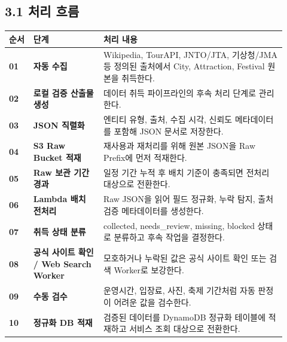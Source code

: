 \documentclass[12pt,a4paper]{article}
\newcommand{\DocNeedspace}[1]{\par\ifdim\dimexpr\pagegoal-\pagetotal\relax<#1\newpage\fi}
\renewcommand{\arraystretch}{1.35}
\begin{document}
\DocNeedspace{8\baselineskip}
\subsection*{3.1 처리 흐름}


\DocNeedspace{18\baselineskip}
\begin{center}
\renewcommand{\arraystretch}{1.45}
\begin{footnotesize}
\begin{tabular}{@{}>{\centering\arraybackslash}m{0.085\linewidth}>{\RaggedRight\arraybackslash}m{0.230\linewidth}>{\RaggedRight\arraybackslash}m{0.605\linewidth}@{}}
\toprule
\textbf{순서} & \textbf{단계} & \textbf{처리 내용} \\
\midrule
\textcolor{LovvGreen}{\textbf{01}} & \textbf{자동 수집} & Wikipedia, TourAPI, JNTO/JTA, 기상청/JMA 등 정의된 출처에서 City, Attraction, Festival 원본을 취득한다. \\
\addlinespace[0.12em]
\textcolor{LovvGreen}{\textbf{02}} & \textbf{로컬 검증 산출물 생성} & 데이터 취득 파이프라인의 후속 처리 단계로 관리한다. \\
\addlinespace[0.12em]
\textcolor{LovvGreen}{\textbf{03}} & \textbf{JSON 직렬화} & 엔티티 유형, 출처, 수집 시각, 신뢰도 메타데이터를 포함해 JSON 문서로 저장한다. \\
\addlinespace[0.12em]
\textcolor{LovvGreen}{\textbf{04}} & \textbf{S3 Raw Bucket 적재} & 재사용과 재처리를 위해 원본 JSON을 Raw Prefix에 먼저 적재한다. \\
\addlinespace[0.12em]
\textcolor{LovvGreen}{\textbf{05}} & \textbf{Raw 보관 기간 경과} & 일정 기간 누적 후 배치 기준이 충족되면 전처리 대상으로 전환한다. \\
\addlinespace[0.12em]
\textcolor{LovvGreen}{\textbf{06}} & \textbf{Lambda 배치 전처리} & Raw JSON을 읽어 필드 정규화, 누락 탐지, 출처 검증 메타데이터를 생성한다. \\
\addlinespace[0.12em]
\textcolor{LovvGreen}{\textbf{07}} & \textbf{취득 상태 분류} & collected, needs\_review, missing, blocked 상태로 분류하고 후속 작업을 결정한다. \\
\addlinespace[0.12em]
\textcolor{LovvGreen}{\textbf{08}} & \textbf{공식 사이트 확인 / Web Search Worker} & 모호하거나 누락된 값은 공식 사이트 확인 또는 검색 Worker로 보강한다. \\
\addlinespace[0.12em]
\textcolor{LovvGreen}{\textbf{09}} & \textbf{수동 검수} & 운영시간, 입장료, 사진, 축제 기간처럼 자동 판정이 어려운 값을 검수한다. \\
\addlinespace[0.12em]
\textcolor{LovvGreen}{\textbf{10}} & \textbf{정규화 DB 적재} & 검증된 데이터를 DynamoDB 정규화 테이블에 적재하고 서비스 조회 대상으로 전환한다. \\
\bottomrule
\end{tabular}
\end{footnotesize}
\end{center}
\end{document}
